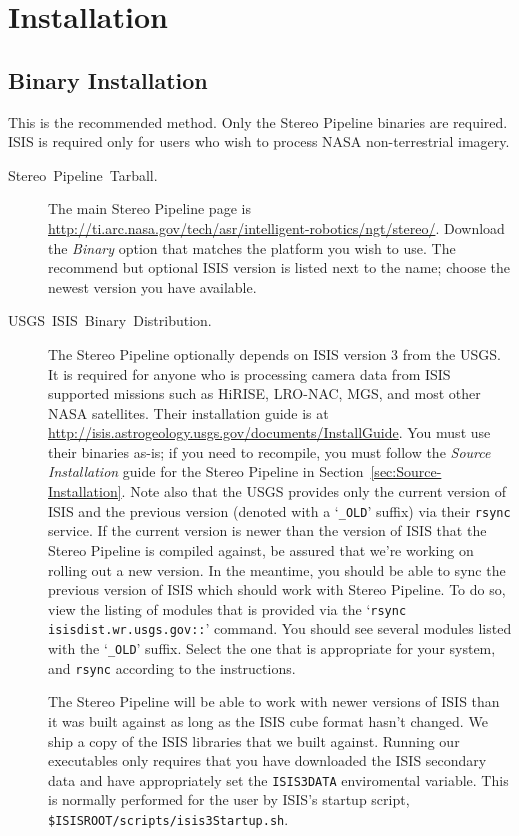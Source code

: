 \chapter{Installation}

\section{Binary Installation}

This is the recommended method. Only the Stereo Pipeline binaries are
required. ISIS is required only for users who wish to process
NASA non-terrestrial imagery.

\begin{description}
\item [{Stereo~Pipeline~Tarball.}] The main Stereo Pipeline page is \\
\url{http://ti.arc.nasa.gov/tech/asr/intelligent-robotics/ngt/stereo/}.
Download the \emph{Binary} option that matches the platform you wish
to use. The recommend but optional \ac{ISIS} version is listed next to
the name; choose the newest version you have available.

\item [{USGS~ISIS~Binary~Distribution.}]

The Stereo Pipeline optionally depends on \ac{ISIS} version 3 from the
\ac{USGS}\@. It is required for anyone who is processing camera data
from ISIS supported missions such as HiRISE, LRO-NAC, MGS, and most
other NASA satellites. Their installation guide is at
\url{http://isis.astrogeology.usgs.gov/documents/InstallGuide}. You
must use their binaries as-is; if you need to recompile, you must
follow the \emph{Source Installation} guide for the Stereo Pipeline in
Section~\ref{sec:Source-Installation}.  Note also that the \ac{USGS}
provides only the current version of \ac{ISIS} and the previous
version (denoted with a `\texttt{\_OLD}' suffix) via their
\texttt{rsync} service.  If the current version is newer than the
version of ISIS that the Stereo Pipeline is compiled against, be
assured that we're working on rolling out a new version.  In the
meantime, you should be able to sync the previous version of ISIS
which should work with Stereo Pipeline.  To do so, view the listing of
modules that is provided via the `\texttt{rsync
  isisdist.wr.usgs.gov::}' command.  You should see several modules
listed with the `\texttt{\_OLD}' suffix.  Select the one that is
appropriate for your system, and \texttt{rsync} according to the
instructions.

The Stereo Pipeline will be able to work with newer versions of ISIS
than it was built against as long as the ISIS cube format hasn't
changed. We ship a copy of the ISIS libraries that we built
against. Running our executables only requires that you have
downloaded the ISIS secondary data and have appropriately set the
\texttt{ISIS3DATA} enviromental variable. This is normally performed
for the user by ISIS's startup script,
\texttt{\$ISISROOT/scripts/isis3Startup.sh}.

\end{description}

